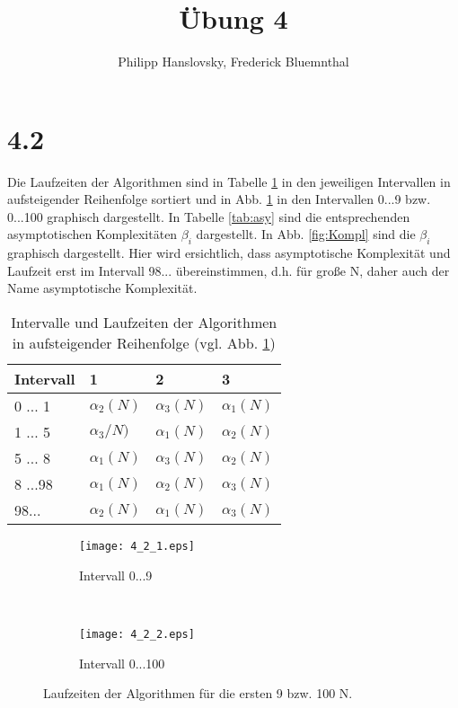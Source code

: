 \documentclass[a4paper,11pt]{article}
\title{\"Ubung 4}
\author{Philipp Hanslovsky, Frederick Bluemnthal}
\theoremstyle{definition}
\theoremstyle{plain}
\theoremstyle{remark}
\begin{document}
\maketitle




\section*{4.2}


Die Laufzeiten der Algorithmen sind in Tabelle \ref{tab:LZ} in den jeweiligen Intervallen in aufsteigender Reihenfolge sortiert und in Abb. \ref{fig:LZ} in den Intervallen 0...9 bzw. 0...100 graphisch dargestellt. In Tabelle \ref{tab:asy} sind die entsprechenden asymptotischen Komplexit\"aten $\beta_i$ dargestellt. In Abb. \ref{fig:Kompl} sind die $\beta_i$ graphisch dargestellt. Hier wird ersichtlich, dass asymptotische Komplexit\"at und Laufzeit erst im Intervall 98... \"ubereinstimmen, d.h. f\"ur gro\ss e N, daher auch der Name asymptotische Komplexit\"at.
\begin{table}[h!]
\centering
\begin{tabular}{|l|l|l|l|}
\hline
Intervall & 1 & 2 & 3 \\\hline
 0 ... 1 & $\alpha_2(N)$ & $\alpha_3(N)$ & $\alpha_1(N)$ \\\hline
 1 ... 5 & $\alpha_3/N)$ & $\alpha_1(N)$ & $\alpha_2(N)$ \\\hline
 5 ... 8 & $\alpha_1(N)$ & $\alpha_3(N)$ & $\alpha_2(N)$ \\\hline
 8 ...98 & $\alpha_1(N)$ & $\alpha_2(N)$ & $\alpha_3(N)$ \\\hline
98...   & $\alpha_2(N)$ & $\alpha_1(N)$ & $\alpha_3(N)$ \\\hline
\end{tabular}
\caption{Intervalle und Laufzeiten der Algorithmen in aufsteigender Reihenfolge (vgl. Abb. \ref{fig:LZ})}
\label{tab:LZ}
\end{table}

\begin{figure}[h!]
\centering
\begin{subfigure}{0.45\textwidth}
\centering
\texttt{[image: 4\_2\_1.eps]}
\caption{Intervall 0...9}
\end{subfigure}
~
\begin{subfigure}{0.45\textwidth}
\centering
\texttt{[image: 4\_2\_2.eps]}
\caption{Intervall 0...100}
\end{subfigure}
\caption{Laufzeiten der Algorithmen f\"ur die ersten 9 bzw. 100 N.}
\label{fig:LZ}
\end{figure}
\end{document}
